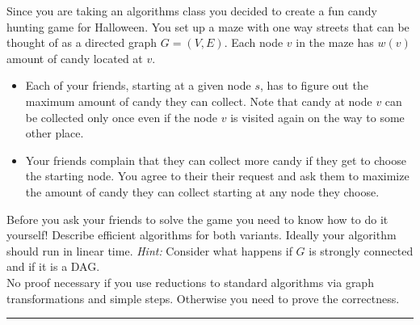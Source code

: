 \documentclass[11pt]{article}
\begin{document}

\item Since you are taking an algorithms class you decided to create a
  fun candy hunting game for Halloween. You set up a maze with one
  way streets that can be thought of as a directed graph
  $G=(V,E)$. Each node $v$ in the maze has $w(v)$ amount of candy
  located at $v$.
  \begin{itemize}
  \item Each of your friends, starting at a given node $s$, has to
    figure out the maximum amount of candy they can collect. Note that
    candy at node $v$ can be collected only once even if the node $v$
    is visited again on the way to some other place.
  \item Your friends complain that they can collect more candy if they
    get to choose the starting node. You agree to their their request
    and ask them to maximize the amount of candy they can collect
    starting at any node they choose.
  \end{itemize}
  Before you ask your friends to solve the game you need to know how
  to do it yourself!  Describe efficient algorithms for both variants.
  Ideally your algorithm should run in linear time.
  {\em Hint:} Consider what happens if $G$ is strongly connected and
  if it is a DAG.\\
  No proof necessary if you use reductions to standard algorithms via
  graph transformations and simple steps. Otherwise you need to prove
  the correctness.
\hrule
\end{document}
